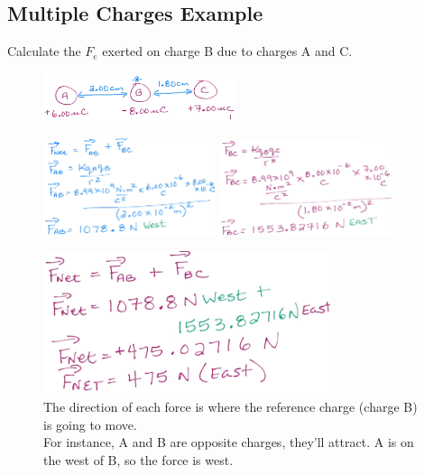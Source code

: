 \documentclass[a4paper,12pt]{article}
\begin{document}
\pagebreak
\subsection{Multiple Charges Example}
Calculate the $F_e$ exerted on charge B due to charges A and C.
\begin{figure}[H]
    \centering
    \includegraphics[width=0.50\textwidth]{Fequestion}
\end{figure}
\begin{figure}[H]
    \centering
    \includegraphics[width=0.45\textwidth]{Fequestion2}
    \includegraphics[width=0.45\textwidth]{Fequestion3}
    \caption{The direction of each force is where the reference charge (charge B) is going to move. \\For instance, A and B are opposite charges, they'll attract. A is on the west of B, so the force is west.}
    \includegraphics[width=0.75\textwidth]{Fequestion4}
\end{figure}
\end{document}
